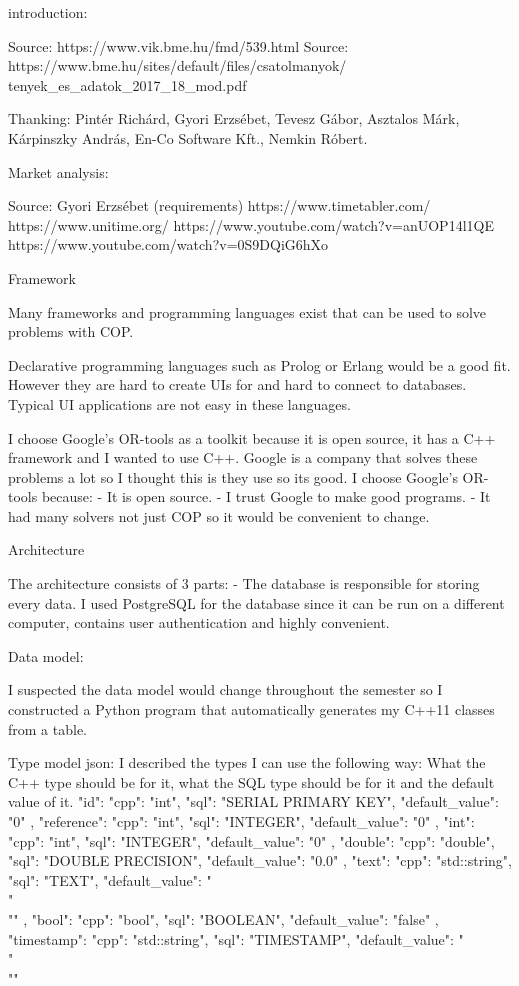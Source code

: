 introduction:

Source: https://www.vik.bme.hu/fmd/539.html
Source: https://www.bme.hu/sites/default/files/csatolmanyok/
                tenyek\_es\_adatok\_2017\_18\_mod.pdf

Thanking:
Pintér Richárd, Gyori Erzsébet, Tevesz Gábor, Asztalos Márk, Kárpinszky András, En-Co Software Kft., Nemkin Róbert.

Market analysis:

Source:
Gyori Erzsébet (requirements)
https://www.timetabler.com/
https://www.unitime.org/
https://www.youtube.com/watch?v=anUOP14l1QE
https://www.youtube.com/watch?v=0S9DQiG6hXo


Framework

Many frameworks and programming languages exist that can be used to solve problems with COP.

Declarative programming languages such as Prolog or Erlang would be a good fit. However they are hard to create UIs for and hard to connect to databases. Typical UI applications are not easy in these languages.

I choose Google's OR-tools as a toolkit because it is open source, it has a C++ framework and I wanted to use C++. Google is a company that solves these problems a lot so I thought this is they use so its good.
I choose Google's OR-tools because:
- It is open source.
- I trust Google to make good programs.
- It had many solvers not just COP so it would be convenient to change.

Architecture

The architecture consists of 3 parts:
- The database is responsible for storing every data.  I used PostgreSQL for the database since it can be run on a different computer, contains user authentication and highly convenient.

Data model:

I suspected the data model would change throughout the semester so I constructed a Python program that automatically generates my C++11 classes from a table.

Type model json:
I described  the types I can use the following way: What the C++ type should be for it, what the SQL type should be for it and the default value of it.
{
    "id": {
        "cpp": "int", 
        "sql": "SERIAL PRIMARY KEY",
        "default\_value": "0"
    },
    "reference": {
        "cpp": "int",
        "sql": "INTEGER",
        "default\_value": "0"
    },
    "int": {
        "cpp": "int",
        "sql": "INTEGER",
        "default\_value": "0"
    },
    "double": {
        "cpp": "double",
        "sql": "DOUBLE PRECISION",
        "default\_value": "0.0"
    },
    "text": {
        "cpp": "std::string",
        "sql": "TEXT",
        "default\_value": "\\"\\""
    },
    "bool": {
        "cpp": "bool",
        "sql": "BOOLEAN",
        "default\_value": "false"
    },
    "timestamp": {
        "cpp": "std::string",
        "sql": "TIMESTAMP",
        "default\_value": "\\"\\"" 
    }
}

